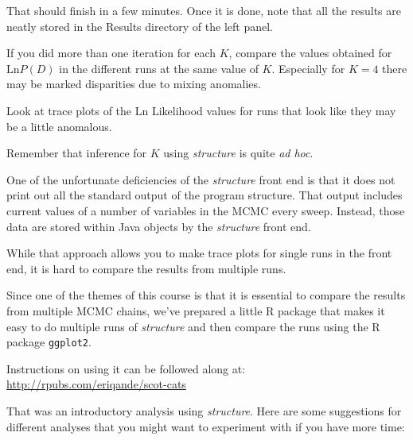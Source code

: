 That should finish in a few minutes.  Once it is done, note that all the results are neatly stored in the Results directory of the left panel.  

If you did more than one iteration for each $K$, compare the values obtained for $\mathrm{Ln} P(D)$ in the different runs at the same value of $K$.  Especially for $K=4$ there may be marked disparities due to mixing anomalies.  

Look at trace plots of the Ln Likelihood values for runs that look like they may be a little anomalous.

Remember that inference for $K$ using {\em structure} is quite {\em ad hoc}. 

One of the unfortunate deficiencies of the {\em structure} front end is that it does not
print out all the standard output of the program structure.  That output includes current
values of a number of variables in the MCMC every sweep.  Instead, those data are stored
within Java objects by the {\em structure} front end.  

While that approach allows you to make trace plots for single runs in the front end, it is hard to compare the results from multiple runs.

Since one of the themes of this course is that it is essential to compare the results from
multiple MCMC chains, we've prepared a little R package that makes it easy to do multiple
runs of {\em structure} and then compare the runs using the R package {\tt ggplot2}.

Instructions on using it can be followed along at:\\
\url{http://rpubs.com/eriqande/scot-cats}

That was an introductory analysis using {\em structure}.  Here are some suggestions for different analyses that you might want to experiment with if you have more time:

